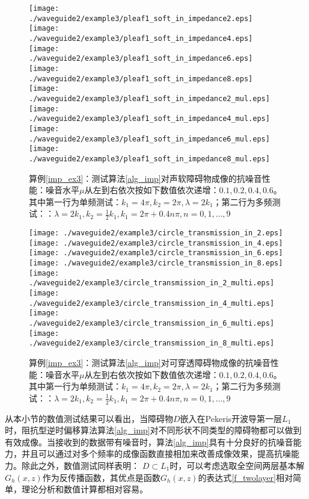\begin{figure}[htbp]
  \centering
  \texttt{[image: ./waveguide2/example3/pleaf1\_soft\_in\_impedance2.eps]}
  \texttt{[image: ./waveguide2/example3/pleaf1\_soft\_in\_impedance4.eps]}
  \texttt{[image: ./waveguide2/example3/pleaf1\_soft\_in\_impedance6.eps]}
  \texttt{[image: ./waveguide2/example3/pleaf1\_soft\_in\_impedance8.eps]}
  \texttt{[image: ./waveguide2/example3/pleaf1\_soft\_in\_impedance2\_mul.eps]}
  \texttt{[image: ./waveguide2/example3/pleaf1\_soft\_in\_impedance4\_mul.eps]}
  \texttt{[image: ./waveguide2/example3/pleaf1\_soft\_in\_impedance6\_mul.eps]}
  \texttt{[image: ./waveguide2/example3/pleaf1\_soft\_in\_impedance8\_mul.eps]}
  \caption{算例\ref{imp_ex3}：测试算法\ref{alg_imp}对声软障碍物成像的抗噪音性能：噪音水平$\mu$从左到右依次按如下数值依次递增：$0.1,0.2,0.4,0.6$。其中第一行为单频测试：$k_1=4\pi,k_2=2\pi,\lambda=2k_1$；第二行为多频测试：：$\lambda=2k_1,k_2=\frac{1}{2}k_1,k_1=2\pi+0.4n\pi,n=0,1,\ldots,9$}\label{fig_imp_ex3_1}
\end{figure}
\begin{figure}[htbp]
  \centering
  \texttt{[image: ./waveguide2/example3/circle\_transmission\_in\_2.eps]}
  \texttt{[image: ./waveguide2/example3/circle\_transmission\_in\_4.eps]}
  \texttt{[image: ./waveguide2/example3/circle\_transmission\_in\_6.eps]}
  \texttt{[image: ./waveguide2/example3/circle\_transmission\_in\_8.eps]}
  \texttt{[image: ./waveguide2/example3/circle\_transmission\_in\_2\_multi.eps]}
  \texttt{[image: ./waveguide2/example3/circle\_transmission\_in\_4\_multi.eps]}
  \texttt{[image: ./waveguide2/example3/circle\_transmission\_in\_6\_multi.eps]}
  \texttt{[image: ./waveguide2/example3/circle\_transmission\_in\_8\_multi.eps]}
   \caption{算例\ref{imp_ex3}：测试算法\ref{alg_imp}对可穿透障碍物成像的抗噪音性能：噪音水平$\mu$从左到右依次按如下数值依次递增：$0.1,0.2,0.4,0.6$。其中第一行为单频测试：$k_1=4\pi,k_2=2\pi,\lambda=2k_1$；第二行为多频测试：：$\lambda=2k_1,k_2=\frac{1}{2}k_1,k_1=2\pi+0.4n\pi,n=0,1,\ldots,9$}\label{fig_imp_ex3_2}
\end{figure}
\begin{remark}
	从本小节的数值测试结果可以看出，当障碍物$D$嵌入在Pekeris开波导第一层$L_1$时，阻抗型逆时偏移算法算法\ref{alg_imp}对不同形状不同类型的障碍物都可以做到有效成像。当接收到的数据带有噪音时，算法\ref{alg_imp}具有十分良好的抗噪音能力，并且可以通过对多个频率的成像函数直接相加来改善成像效果，提高抗噪能力。除此之外，数值测试同样表明：
	$D\subset L_1$时，可以考虑选取全空间两层基本解$G_h(x,z)$作为反传播函数，其优点是函数$G_h(x,z)$的表达式\eqref{f_twolayer}相对简单，理论分析和数值计算都相对容易。
\end{remark}
